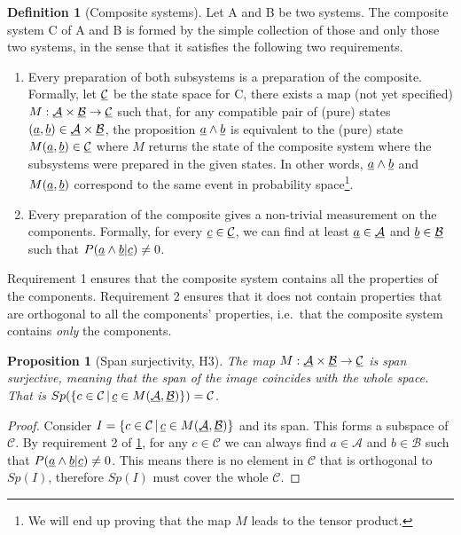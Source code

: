 \documentclass[aps,prl,amsmath,amssymb,twocolumn,nofootinbib]{revtex4}
\theoremstyle{plain}
\newtheorem{prop}[thrm]{Proposition}
\theoremstyle{definition}
\newtheorem{defn}[thrm]{Definition}
\theoremstyle{remark}
\newcommand{\pj}[1] {\underbar{$#1$}}
\begin{document}
\begin{defn}[Composite systems]\label{def_comp}
Let A and B be two systems. The composite system C of A and B is formed by the simple collection of those and only those two systems, in the sense that it satisfies the following two requirements.
\begin{enumerate}
    \item Every preparation of both subsystems is a preparation of the
      composite. Formally, let $\pj{\mathcal{C}}$ be the state space
      for C, there exists a map (not yet specified)
      $M:\pj{\mathcal{A}}\times\pj{\mathcal{B}}\to\pj{\mathcal{C}}$
      such that, for any compatible pair of (pure) states $(\pj{a},\pj{b}) \in \pj{\mathcal{A}}\times\pj{\mathcal{B}}$, the proposition $\pj{a} \wedge \pj{b}$ is equivalent to the (pure) state $M(\pj{a},\pj{b}) \in \pj{\mathcal{C}}$ where $M$ returns the state of the composite system where the subsystems were prepared in the given states. In other words, $\pj{a} \wedge \pj{b}$ and $M(\pj{a},\pj{b})$ correspond to the same event in probability space\footnote{We will end up proving that the map $M$ leads to the tensor product.}.
    \item Every preparation of the composite gives a non-trivial measurement on the components. Formally, for every $\pj{c} \in \pj{\mathcal{C}}$, we can find at least $\pj{a} \in \pj{\mathcal{A}}$ and $\pj{b} \in \pj{\mathcal{B}}$ such that $P(\pj{a} \wedge \pj{b}|\pj{c})\neq 0$. 
\end{enumerate}
Requirement 1 ensures that the composite system contains all the properties of the components. Requirement 2 ensures that it does not contain properties that are orthogonal to all the components' properties, i.e.~that the composite system contains {\em only} the components.
\end{defn}

\begin{prop}[Span surjectivity, H3]\label{prop_spanSurj}
  The map $M :
  \pj{\mathcal{A}}\times\pj{\mathcal{B}} \to \pj{\mathcal{C}}$ is span
  surjective, meaning that the span of the image coincides with the
  whole space. That is $Sp(\{ c \in \mathcal{C} \, | \, \pj{c} \in
  M(\pj{\mathcal{A}}, \pj{\mathcal{B}})\}) = \mathcal{C}$.
\end{prop}
\begin{proof}
  Consider $I=\{ c \in \mathcal{C} \, | \, \pj{c} \in M(\pj{\mathcal{A}}, \pj{\mathcal{B}})\}$ and its span. This forms a subspace of $\mathcal{C}$. By requirement 2 of \ref{def_comp}, for any $c \in \mathcal{C}$ we can always find $a \in \mathcal{A}$ and $b \in \mathcal{B}$ such that $P(\pj{a} \wedge \pj{b} | \pj{c} )\neq 0$. This means there is no element in $\mathcal{C}$ that is orthogonal to $Sp(I)$, therefore $Sp(I)$ must cover the whole $\mathcal{C}$.
\end{proof}
\end{document}
